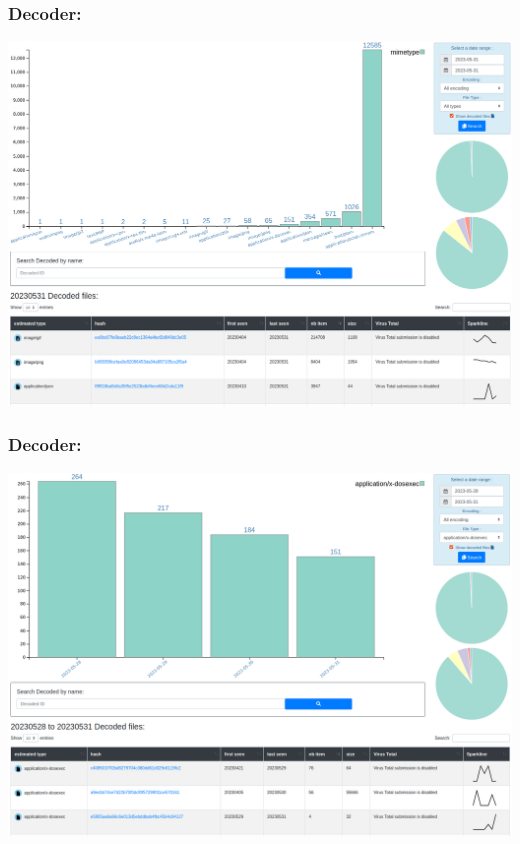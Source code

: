 \documentclass{beamer}
\begin{document}
\begin{frame}
    \frametitle{Decoder:}
    \centerline{
        \includegraphics[scale=0.23]{screenshot/decodeds_dashboard.png}
    }
\end{frame}

\begin{frame}
    \frametitle{Decoder:}
    \centerline{
        \includegraphics[scale=0.23]{screenshot/decodeds_dos.png}
    }
\end{frame}
\end{document}

